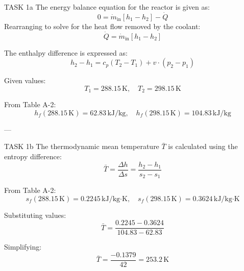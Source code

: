TASK 1a  
The energy balance equation for the reactor is given as:  
\[
0 = \dot{m}_{\text{in}} \left[ h_1 - h_2 \right] - \dot{Q}
\]  
Rearranging to solve for the heat flow removed by the coolant:  
\[
\dot{Q} = \dot{m}_{\text{in}} \left[ h_1 - h_2 \right]
\]  

The enthalpy difference is expressed as:  
\[
h_2 - h_1 = c_p \left( T_2 - T_1 \right) + v \cdot \left( p_2 - p_1 \right)
\]  

Given values:  
\[
T_1 = 288.15 \, \text{K}, \quad T_2 = 298.15 \, \text{K}
\]  

From Table A-2:  
\[
h_f(288.15 \, \text{K}) = 62.83 \, \text{kJ/kg}, \quad h_f(298.15 \, \text{K}) = 104.83 \, \text{kJ/kg}
\]  

---

TASK 1b  
The thermodynamic mean temperature \( \bar{T} \) is calculated using the entropy difference:  
\[
\bar{T} = \frac{\Delta h}{\Delta s} = \frac{h_2 - h_1}{s_2 - s_1}
\]  

From Table A-2:  
\[
s_f(288.15 \, \text{K}) = 0.2245 \, \text{kJ/kg·K}, \quad s_f(298.15 \, \text{K}) = 0.3624 \, \text{kJ/kg·K}
\]  

Substituting values:  
\[
\bar{T} = \frac{0.2245 - 0.3624}{104.83 - 62.83}
\]  

Simplifying:  
\[
\bar{T} = \frac{-0.1379}{42} = 253.2 \, \text{K}
\]  

